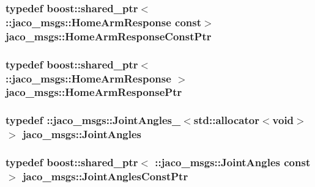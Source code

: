 \subsubsection[{\texorpdfstring{Home\+Arm\+Response\+Const\+Ptr}{HomeArmResponseConstPtr}}]{\setlength{\rightskip}{0pt plus 5cm}typedef boost\+::shared\+\_\+ptr$<$ \+::{\bf jaco\+\_\+msgs\+::\+Home\+Arm\+Response} const$>$ {\bf jaco\+\_\+msgs\+::\+Home\+Arm\+Response\+Const\+Ptr}}\hypertarget{namespacejaco__msgs_af03d62d3bf564dc6a378a3b4f2d4fdcd}{}\label{namespacejaco__msgs_af03d62d3bf564dc6a378a3b4f2d4fdcd}
\subsubsection[{\texorpdfstring{Home\+Arm\+Response\+Ptr}{HomeArmResponsePtr}}]{\setlength{\rightskip}{0pt plus 5cm}typedef boost\+::shared\+\_\+ptr$<$ \+::{\bf jaco\+\_\+msgs\+::\+Home\+Arm\+Response} $>$ {\bf jaco\+\_\+msgs\+::\+Home\+Arm\+Response\+Ptr}}\hypertarget{namespacejaco__msgs_a4bb26e957ea3bfdff2150cc2adcaef08}{}\label{namespacejaco__msgs_a4bb26e957ea3bfdff2150cc2adcaef08}
\subsubsection[{\texorpdfstring{Joint\+Angles}{JointAngles}}]{\setlength{\rightskip}{0pt plus 5cm}typedef \+::{\bf jaco\+\_\+msgs\+::\+Joint\+Angles\+\_\+}$<$std\+::allocator$<$void$>$ $>$ {\bf jaco\+\_\+msgs\+::\+Joint\+Angles}}\hypertarget{namespacejaco__msgs_ae38be3f0cdaac5905b3df022403d6ef4}{}\label{namespacejaco__msgs_ae38be3f0cdaac5905b3df022403d6ef4}
\subsubsection[{\texorpdfstring{Joint\+Angles\+Const\+Ptr}{JointAnglesConstPtr}}]{\setlength{\rightskip}{0pt plus 5cm}typedef boost\+::shared\+\_\+ptr$<$ \+::{\bf jaco\+\_\+msgs\+::\+Joint\+Angles} const$>$ {\bf jaco\+\_\+msgs\+::\+Joint\+Angles\+Const\+Ptr}}\hypertarget{namespacejaco__msgs_a32b25235cc3066080b29ddfde0640ae9}{}\label{namespacejaco__msgs_a32b25235cc3066080b29ddfde0640ae9}
